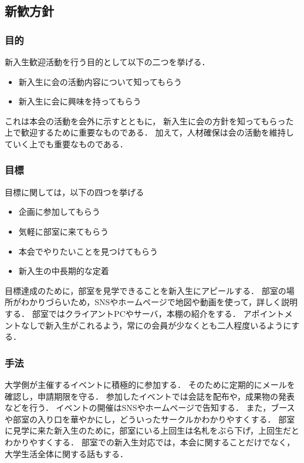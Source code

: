 \subsection*{新歓方針}


\subsubsection*{目的}
新入生歓迎活動を行う目的として以下の二つを挙げる．
\begin{itemize}
\item 新入生に会の活動内容について知ってもらう
\item 新入生に会に興味を持ってもらう
\end{itemize}
これは本会の活動を会外に示すとともに，
新入生に会の方針を知ってもらった上で歓迎するために重要なものである．
加えて，人材確保は会の活動を維持していく上でも重要なものである．

\subsubsection*{目標}
目標に関しては，以下の四つを挙げる
\begin{itemize}
\item 企画に参加してもらう
\item 気軽に部室に来てもらう
\item 本会でやりたいことを見つけてもらう
\item 新入生の中長期的な定着
\end{itemize}
目標達成のために，部室を見学できることを新入生にアピールする．
部室の場所がわかりづらいため，SNSやホームページで地図や動画を使って，詳しく説明する．
部室ではクライアントPCやサーバ，本棚の紹介をする．
アポイントメントなしで新入生がこれるよう，常に\secondGrade{}の会員が少なくとも二人程度いるようにする．

\subsubsection*{手法}
大学側が主催するイベントに積極的に参加する．
そのために定期的にメールを確認し，申請期限を守る．
参加したイベントでは会誌を配布や，成果物の発表などを行う．
イベントの開催はSNSやホームページで告知する．
また，ブースや部室の入り口を華やかにし，どういったサークルかわかりやすくする．
部室に見学に来た新入生のために，部室にいる上回生は名札をぶら下げ，上回生だとわかりやすくする．
部室での新入生対応では，本会に関することだけでなく，大学生活全体に関する話もする．
